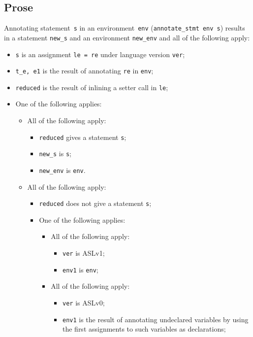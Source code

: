 \documentclass{book}
\begin{document}
  \subsection{Prose}
Annotating statement~\texttt{s} in an environment~\texttt{env}
(\texttt{annotate\_stmt env s}) results in a statement \texttt{new\_s} and an
environment \texttt{new\_env} and all of the following apply:
   \begin{itemize}
   \item \texttt{s} is an assignment \texttt{le = re} under language version \texttt{ver};
   \item \texttt{t\_e, e1} is the result of annotating \texttt{re} in \texttt{env};
   \item \texttt{reduced} is the result of inlining a setter call in \texttt{le};
   \item One of the following applies:
     \begin{itemize}
     \item All of the following apply:
       \begin{itemize}
       \item \texttt{reduced} gives a statement \texttt{s};
       \item \texttt{new\_s} is \texttt{s};
       \item \texttt{new\_env} is \texttt{env}.
       \end{itemize}     

     \item All of the following apply:
       \begin{itemize}
       \item \texttt{reduced} does not give a statement \texttt{s};
       \item One of the following applies:
         \begin{itemize}
         \item All of the following apply:
           \begin{itemize}
           \item \texttt{ver} is ASLv1;
           \item \texttt{env1} is \texttt{env};
           \end{itemize}
         \item All of the following apply:
           \begin{itemize}
           \item \texttt{ver} is ASLv0;
	   \item \texttt{env1} is the result of annotating undeclared variables by using
	      the first assignments to such variables as declarations;
           \end{itemize}
         \end{itemize} 


\end{itemize}
\end{itemize}
\end{itemize}
\end{document}
